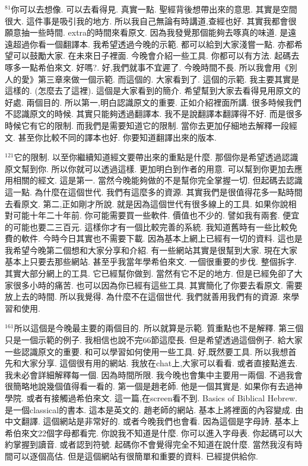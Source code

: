 \documentclass{book}
\begin{document}
$^{81}$你可以去想像.
可以去看得見.
真實一點.
聖經背後想帶出來的意思.
其實是空間很大.
這件事是吸引我的地方.
所以我自己無論有時講道,查經也好.
其實我都會很願意抽一些時間.
extra的時間來看原文.
因為我發覺那個能夠去啄真的味道.
是遠遠超過你看一個翻譯本.
我希望透過今晚的示範.
都可以給到大家淺嘗一點.
亦都希望可以鼓勵大家.
在未來日子裡面.
今晚會介紹一些工具.
你都可以有方法.
起碼去啄多一點希伯來文.
好嗎?.
好,我們就事不宜遲了.
今晚時間不長.
所以我會用《別人的愛》第三章來做一個示範.
而這個的.
大家看到了.
這個的示範.
我主要其實是這樣的.
(怎麼去了這裡).
這個是大家看到的簡介.
希望幫到大家去看得見用原文的好處.
兩個目的.
所以第一,明白認識原文的重要.
正如介紹裡面所講.
很多時候我們不認識原文的時候.
其實只能夠透過翻譯本.
我不是說翻譯本翻譯得不好.
而是很多時候它有它的限制.
而我們是需要知道它的限制.
當你去更加仔細地去解釋一段經文.
甚至你比較不同的譯本也好.
你要知道翻譯出來的版本.

$^{121}$它的限制.
以至你繼續知道經文要帶出來的重點是什麼.
那個你是希望透過認識原文幫到你.
所以你就可以透過這樣.
更加明白到作者的用意.
可以幫到你更加去應用相關的經文.
這是第一.
當然今晚能夠做的不是幫你完全掌握一切.
但起碼去認識這一點.
為什麼在這個世代.
我們有這麼多的資源.
其實我們是很值得花多一點時間去看原文.
第二,正如剛才所說.
就是因為這個世代有很多線上的工具.
如果你說相對可能十年二十年前.
你可能需要買一些軟件.
價值也不少的.
譬如我有兩套.
便宜的可能也要二三百元.
這樣你才有一個比較完善的系統.
我知道舊時有一些比較免費的軟件.
今時今日其實也不需要下載.
因為基本上網上已經有一切的資料.
這也是我希望今晚第二個想和大家分享和介紹.
有一些網站其實是很幫到大家.
現在大家基本上只要去那些網站.
甚至乎我當年學希伯來文.
一個很重要的步伐.
整個拆字.
其實大部分網上的工具.
它已經幫你做到.
當然有它不足的地方.
但是已經免卻了大家很多小時的痛苦.
也可以因為你已經有這些工具.
其實簡化了你要去看原文.
需要放上去的時間.
所以我覺得.
為什麼不在這個世代.
我們就善用我們有的資源.
來學習和使用.

$^{161}$所以這個是今晚最主要的兩個目的.
所以就算是示範.
質重點也不是解釋.
第三個只是一個示範的例子.
我相信也說不完66節這麼長.
但是希望透過這個例子.
給大家一些認識原文的重要.
和可以學習如何使用一些工具.
好,既然要工具.
所以我想首先和大家分享.
這個很有用的網站.
我放在chat上,大家可以看看.
或者直接點進去.
我未必會詳細解釋每一個.
因為時間所限.
我今晚也會集中主要用一兩個.
不過我會很簡略地說幾個值得看一看的.
第一個是趙老師.
他是一個其實是.
如果你有去過神學院.
或者有接觸過希伯來文.
這一篇,在screen看不到.
Basics of Biblical Hebrew.
是一個classical的書本.
這本是英文的.
趙老師的網站.
基本上將裡面的內容變成.
由中文翻譯.
這個網站是非常好的.
或者今晚我們也會看.
因為這個是字母詩.
基本上希伯來文22個字母都看完.
你說我不知道是什麼.
你可以進入字母表.
你起碼可以大約掌握到讀音.
或者認到符號.
起碼你不會覺得完全不知道在說什麼.
當然我沒有時間可以逐個高估.
但是這個網站有很簡單和重要的資料.
已經提供給你.
\end{document}
